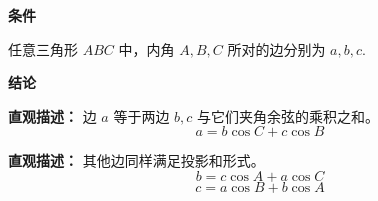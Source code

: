 \begin{statementbox}
	\textbf{\textcolor{CStatement}{条件}}
	\begin{description}[style=nextline, leftmargin=2.8em, labelsep=0.5em, itemsep=0.35em]
		\item[\textbf{\textcolor{CStatement}{条件1（三角形条件）：}}] 任意三角形 $ABC$ 中，内角 $A,B,C$ 所对的边分别为 $a,b,c$.
	\end{description}
	\textbf{\textcolor{CStatement}{结论}}
	\begin{description}[style=nextline, leftmargin=2.8em, labelsep=0.5em, itemsep=0.45em]
		\item[\textbf{\textcolor{CStatement}{结论一（射影公式）：}}]
			\textbf{\textcolor{CStatement}{直观描述：}}
			边 $a$ 等于两边 $b,c$ 与它们夹角余弦的乘积之和。
			\[
				a = b\cos C + c\cos B
			\]
		\item[\textbf{\textcolor{CStatement}{推广结论（轮换对称性）：}}]
			\textbf{\textcolor{CStatement}{直观描述：}}
			其他边同样满足投影和形式。
			\[
				b = c\cos A + a\cos C
			\]
			\[
				c = a\cos B + b\cos A
			\]
	\end{description}
\end{statementbox}
